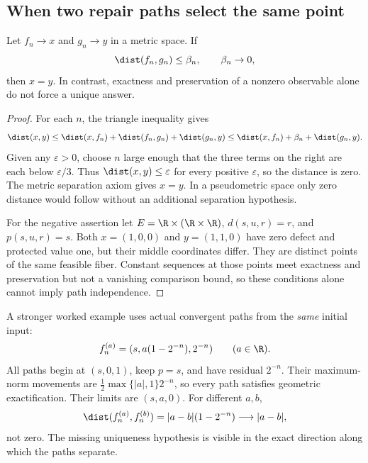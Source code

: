 \subsection{When two repair paths select the same point}
\begin{proposition}\label{KS74}
Let \(f_n\to x\) and \(g_n\to y\) in a metric space. If
\[
 \dist(f_n,g_n)\le\beta_n,\qquad\beta_n\to0,
\]
then \(x=y\). In contrast, exactness and preservation of a nonzero observable alone do not force a unique answer.
\end{proposition}
\begin{proof}
For each \(n\), the triangle inequality gives
\[
 \dist(x,y)\le\dist(x,f_n)+\dist(f_n,g_n)+\dist(g_n,y)
 \le\dist(x,f_n)+\beta_n+\dist(g_n,y).
\]
Given any \(\varepsilon>0\), choose \(n\) large enough that the three terms on the right are each below \(\varepsilon/3\). Thus \(\dist(x,y)\le\varepsilon\) for every positive \(\varepsilon\), so the distance is zero. The metric separation axiom gives \(x=y\). In a pseudometric space only zero distance would follow without an additional separation hypothesis.

For the negative assertion let \(E=\R\times(\R\times\R)\), \(d(s,u,r)=r\), and \(p(s,u,r)=s\). Both \(x=(1,0,0)\) and \(y=(1,1,0)\) have zero defect and protected value one, but their middle coordinates differ. They are distinct points of the same feasible fiber. Constant sequences at those points meet exactness and preservation but not a vanishing comparison bound, so these conditions alone cannot imply path independence.
\end{proof}
A stronger worked example uses actual convergent paths from the \emph{same} initial input:
\[
 f_n^{(a)}=(s,a(1-2^{-n}),2^{-n})\qquad(a\in\R).
\]
All paths begin at \((s,0,1)\), keep \(p=s\), and have residual \(2^{-n}\). Their maximum-norm movements are \(\frac12\max\{|a|,1\}2^{-n}\), so every path satisfies geometric exactification. Their limits are \((s,a,0)\). For different \(a,b\),
\[
 \dist(f_n^{(a)},f_n^{(b)})=|a-b|(1-2^{-n})\longrightarrow|a-b|,
\]
not zero. The missing uniqueness hypothesis is visible in the exact direction along which the paths separate.



